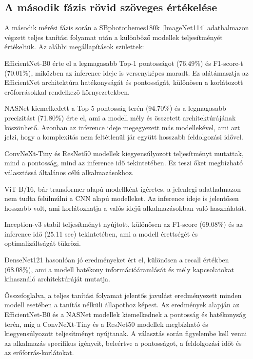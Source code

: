 \subsection{A második fázis rövid szöveges értékelése}
    A második mérési fázis során a SBphotothemes180k [ImageNet114] adathalmazon végzett teljes tanítási folyamat után a különböző modellek teljesítményét értékeltük. Az alábbi megállapítások születtek:

    EfficientNet-B0 érte el a legmagasabb Top-1 pontosságot (76.49\%) és F1-score-t (70.01\%), miközben az inference ideje is versenyképes maradt. Ez alátámasztja az EfficientNet architektúra hatékonyságát és pontosságát, különösen a korlátozott erőforrásokkal rendelkező környezetekben.

    NASNet kiemelkedett a Top-5 pontosság terén (94.70\%) és a legmagasabb precizitást (71.80\%) érte el, ami a modell mély és összetett architektúrájának köszönhető. Azonban az inference ideje megegyezett más modellekével, ami azt jelzi, hogy a komplexitás nem feltétlenül jár együtt hosszabb feldolgozási idővel.

    ConvNeXt-Tiny és ResNet50 modellek kiegyensúlyozott teljesítményt mutattak, mind a pontosság, mind az inference idő tekintetében. Ez teszi őket megbízható választássá általános célú alkalmazásokhoz.

    ViT-B/16, bár transformer alapú modellként ígéretes, a jelenlegi adathalmazon nem tudta felülmúlni a CNN alapú modelleket. Az inference ideje is jelentősen hosszabb volt, ami korlátozhatja a valós idejű alkalmazásokban való használatát.

    Inception-v3 stabil teljesítményt nyújtott, különösen az F1-score (69.08\%) és az inference idő (25.11 sec) tekintetében, ami a modell érettségét és optimalizáltságát tükrözi.

    DenseNet121 hasonlóan jó eredményeket ért el, különösen a recall értékben (68.08\%), ami a modell hatékony információáramlását és mély kapcsolatokat kihasználó architektúráját mutatja.

    Összefoglalva, a teljes tanítási folyamat jelentős javulást eredményezett minden modell esetében a tanítás nélküli állapothoz képest. Az eredmények alapján az EfficientNet-B0 és a NASNet modellek kiemelkednek a pontosság és hatékonyság terén, míg a ConvNeXt-Tiny és a ResNet50 modellek megbízható és kiegyensúlyozott teljesítményt nyújtanak. A választás során figyelembe kell venni az alkalmazás specifikus igényeit, beleértve a pontosságot, a feldolgozási időt és az erőforrás-korlátokat.